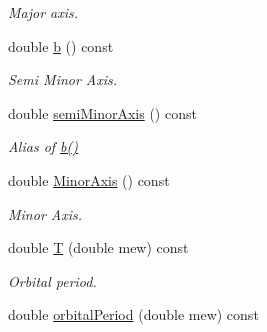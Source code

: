 \begin{DoxyCompactItemize}
\begin{DoxyCompactList}\small\item\em Major axis. \end{DoxyCompactList}\item 
\hypertarget{class_orbit3_d_af395bba2ec4de8552ea8fafeed68189a}{double \hyperlink{class_orbit3_d_af395bba2ec4de8552ea8fafeed68189a}{b} () const }\label{class_orbit3_d_af395bba2ec4de8552ea8fafeed68189a}

\begin{DoxyCompactList}\small\item\em Semi Minor Axis. \end{DoxyCompactList}\item 
\hypertarget{class_orbit3_d_ad221ee0f571570c7b018a942ac49b513}{double \hyperlink{class_orbit3_d_ad221ee0f571570c7b018a942ac49b513}{semi\+Minor\+Axis} () const }\label{class_orbit3_d_ad221ee0f571570c7b018a942ac49b513}

\begin{DoxyCompactList}\small\item\em Alias of \hyperlink{class_orbit3_d_af395bba2ec4de8552ea8fafeed68189a}{b()} \end{DoxyCompactList}\item 
\hypertarget{class_orbit3_d_a08a9a86e2f5e074eb3bdda2efe9c56a0}{double \hyperlink{class_orbit3_d_a08a9a86e2f5e074eb3bdda2efe9c56a0}{Minor\+Axis} () const }\label{class_orbit3_d_a08a9a86e2f5e074eb3bdda2efe9c56a0}

\begin{DoxyCompactList}\small\item\em Minor Axis. \end{DoxyCompactList}\item 
\hypertarget{class_orbit3_d_a5f4c3402ffe5024fa383ccba9d9da88a}{double \hyperlink{class_orbit3_d_a5f4c3402ffe5024fa383ccba9d9da88a}{T} (double mew) const }\label{class_orbit3_d_a5f4c3402ffe5024fa383ccba9d9da88a}

\begin{DoxyCompactList}\small\item\em Orbital period. \end{DoxyCompactList}\item 
\hypertarget{class_orbit3_d_a2c19d1dd86d7feccfa8faa6e431aefd0}{double \hyperlink{class_orbit3_d_a2c19d1dd86d7feccfa8faa6e431aefd0}{orbital\+Period} (double mew) const }\label{class_orbit3_d_a2c19d1dd86d7feccfa8faa6e431aefd0}


\end{DoxyCompactItemize}
